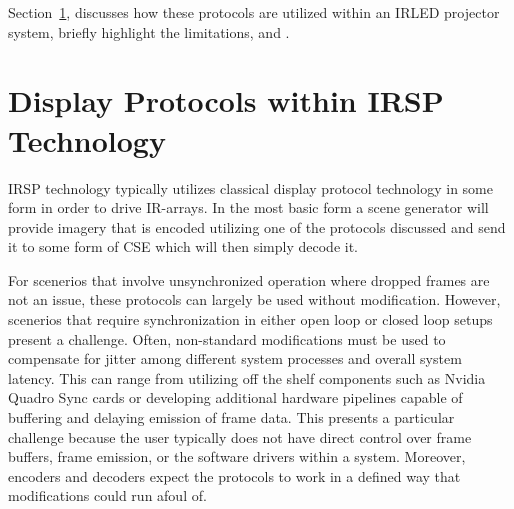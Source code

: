    Section~\ref{sec:displays_within_proj_system}, discusses how these protocols are utilized within an IRLED projector system, briefly highlight the limitations, and . %

\section{Display Protocols within IRSP Technology}
    \label{sec:displays_within_proj_system}
    IRSP technology typically utilizes classical display protocol technology in some form in order to drive IR-arrays. In the most basic form a scene generator will provide imagery that is encoded utilizing one of the protocols discussed and send it to some form of CSE which will then simply decode it.

    For scenerios that involve unsynchronized operation where dropped frames are not an issue, these protocols can largely be used without modification. However, scenerios that require synchronization in either open loop or closed loop setups present a challenge. Often, non-standard modifications must be used to compensate for jitter among different system processes and overall system latency. This can range from utilizing off the shelf components such as Nvidia Quadro Sync cards\cite{NVIDIAQuadroSync} or developing additional hardware pipelines capable of buffering and delaying emission of frame data. This presents a particular challenge because the user typically does not have direct control over frame buffers, frame emission, or the software drivers within a system. Moreover, encoders and decoders expect the protocols to work in a defined way that modifications could run afoul of.
